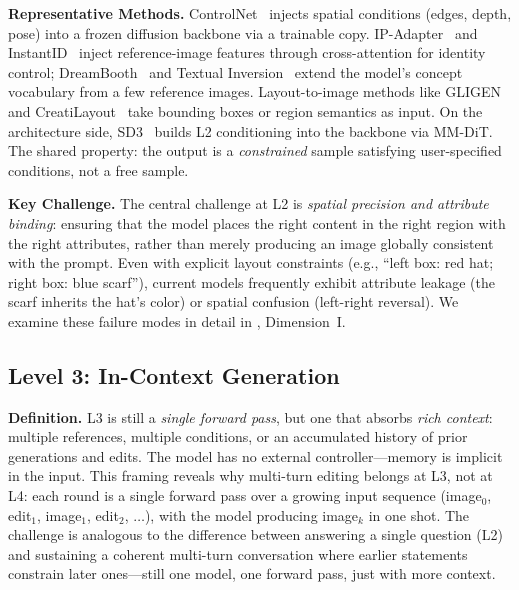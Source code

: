 \textbf{Representative Methods.} ControlNet~\citep{zhang2023controlnet} injects spatial conditions (edges, depth, pose) into a frozen diffusion backbone via a trainable copy. IP-Adapter~\citep{ye2023ip} and InstantID~\citep{wang2024instantid} inject reference-image features through cross-attention for identity control; DreamBooth~\citep{ruiz2023dreambooth} and Textual Inversion~\citep{gal2022image} extend the model's concept vocabulary from a few reference images. Layout-to-image methods like GLIGEN~\citep{li2023gligen} and CreatiLayout~\citep{CreatiLayout} take bounding boxes or region semantics as input. On the architecture side, SD3~\citep{esser2024stablediffusion3} builds L2 conditioning into the backbone via MM-DiT. The shared property: the output is a \emph{constrained} sample satisfying user-specified conditions, not a free sample.

\textbf{Key Challenge.} The central challenge at L2 is \emph{spatial precision and attribute binding}: ensuring that the model places the right content in the right region with the right attributes, rather than merely producing an image globally consistent with the prompt. Even with explicit layout constraints (e.g., ``left box: red hat; right box: blue scarf''), current models frequently exhibit attribute leakage (the scarf inherits the hat's color) or spatial confusion (left-right reversal). We examine these failure modes in detail in , Dimension~I.


\subsection{Level 3: In-Context Generation}
\label{subsec:level3}

\textbf{Definition.} L3 is still a \emph{single forward pass}, but one that absorbs \emph{rich context}: multiple references, multiple conditions, or an accumulated history of prior generations and edits. The model has no external controller---memory is implicit in the input. This framing reveals why multi-turn editing belongs at L3, not at L4: each round is a single forward pass over a growing input sequence (image$_0$, edit$_1$, image$_1$, edit$_2$, $\dots$), with the model producing image$_k$ in one shot. The challenge is analogous to the difference between answering a single question (L2) and sustaining a coherent multi-turn conversation where earlier statements constrain later ones---still one model, one forward pass, just with more context.

